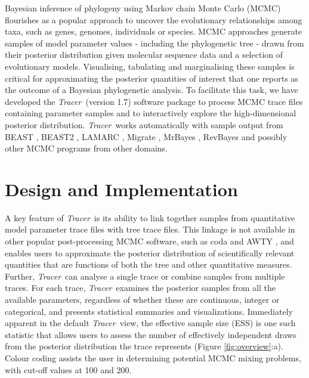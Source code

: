 \documentclass{bioinfo_tracer}
\newcommand{\tracer}{\emph{Tracer}}
\begin{document}
Bayesian inference of phylogeny using Markov chain Monte Carlo (MCMC) \citep{rannala1996probability, mau1999bayesian} flourishes as a popular approach to uncover the evolutionary relationships among taxa, such as genes, genomes, individuals or species.
MCMC approaches generate samples of model parameter values - including the phylogenetic tree - drawn from their posterior distribution given molecular sequence data and a selection of evolutionary models.
Visualising, tabulating and marginalising these samples is critical for approximating the posterior quantities of interest that one reports as the outcome of a Bayesian phylogenetic analysis.
To facilitate this task, we have developed the \tracer\ (version 1.7) software package to
process MCMC trace files containing parameter samples and to interactively explore the high-dimensional posterior distribution.
\tracer\ works automatically with sample output from BEAST \citep{drummond2012bayesian}, BEAST2 \citep{bouckaert2014beast2},  LAMARC \citep{kuhner2006lamarc},  Migrate \citep{beerli2006comparison}, MrBayes \citep{ronquist2012mrbayes}, RevBayes \citep{hohna2016revbayes} and possibly other MCMC programs from other domains.

\section*{Design and Implementation}

A key feature of \tracer\ is its ability to link together samples from quantitative model parameter trace files with tree trace files.
This linkage is not available in other popular post-processing MCMC software, such as coda \citep{plummer2006coda} and AWTY \citep{nylander2007awty}, and enables users to approximate the posterior distribution of scientifically relevant quantities that are functions of both the tree and other quantitative measures.
Further, \tracer\ can analyse a single trace or combine samples from multiple traces.
For each trace, \tracer\ examines the posterior samples from all the available parameters, regardless of whether these are continuous, integer or categorical, and presents statistical summaries and visualizations.
Immediately apparent in the default \tracer\ view, the effective sample size (ESS) is one such statistic that
allows users to assess the number of effectively independent draws from the posterior distribution the trace represents (Figure \ref{fig:overview}:a).
Colour coding assists the user in determining potential MCMC mixing problems, with cut-off values at 100 and 200.
\end{document}
